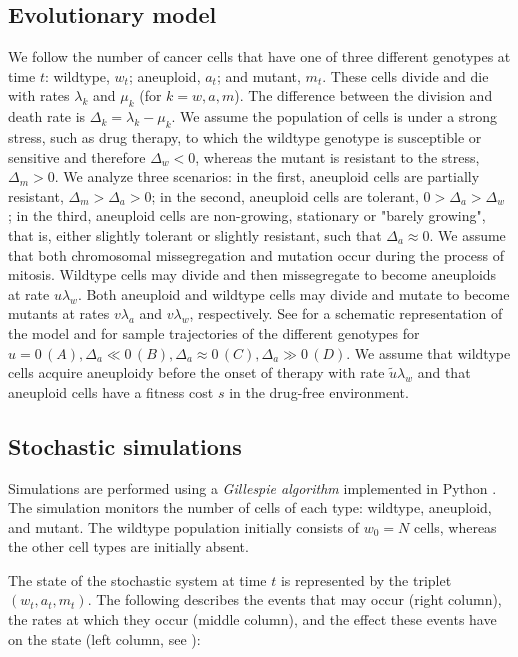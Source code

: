 \documentclass[12pt]{extarticle}
\begin{document}
\subsection*{Evolutionary model}

We follow the number of cancer cells that have one of three different genotypes at time $t$: wildtype, $w_t$; aneuploid, $a_t$; and mutant, $m_t$. 
These cells divide and die with rates $\lambda_k$ and $\mu_k$ (for $k=w, a, m$).
The difference between the division and death rate is $\Delta_k = \lambda_k-\mu_k$.
We assume the population of cells is under a strong stress, such as drug therapy, to which the wildtype genotype is susceptible or sensitive and therefore $\Delta_w<0$, whereas the mutant is resistant to the stress, $\Delta_m>0$.
We analyze three scenarios: in the first, aneuploid cells are partially resistant, $\Delta_m>\Delta_a>0$; in the second, aneuploid cells are tolerant, $0>\Delta_a>\Delta_w$ \citep[see][for the distinction between susceptible, resistant, and tolerant]{brauner2016distinguishing}; in the third, aneuploid cells are non-growing, stationary or "barely growing", that is, either slightly tolerant or slightly resistant, such that $\Delta_a \approx 0$. We assume that both chromosomal missegregation and mutation occur during the process of mitosis. Wildtype cells may divide and then missegregate to become aneuploids at rate $u\lambda_w$. Both aneuploid and wildtype cells may divide and mutate to become mutants at rates $v\lambda_{a}$ and $v\lambda_{w}$, respectively.
See  for a schematic representation of the model and  for sample trajectories of the different genotypes for $u=0 \, (A), \Delta_a\ll0\, (B),\Delta_a\approx0\, (C),\Delta_a\gg0\, (D)$. We assume that wildtype cells acquire aneuploidy before the onset of therapy with rate $\tilde{u}\lambda_w$ and that aneuploid cells have a fitness cost $s$ in the drug-free environment.
\subsection*{Stochastic simulations} 
Simulations are performed using a \emph{Gillespie algorithm} \citep{gillespie1976general,gillespie1977exact} implemented in Python \citep{python}.
The simulation monitors the number of cells of each type: wildtype, aneuploid, and mutant. 
The wildtype population initially consists of $w_0=N$ cells, whereas the other cell types are initially absent.

The state of the stochastic system at time $t$ is represented by the triplet $\left(w_t,a_t,m_t\right)$. The following describes the events that may occur (right column), the rates at which they occur (middle column), and the effect these events have on the state (left column, see ):
\end{document}
